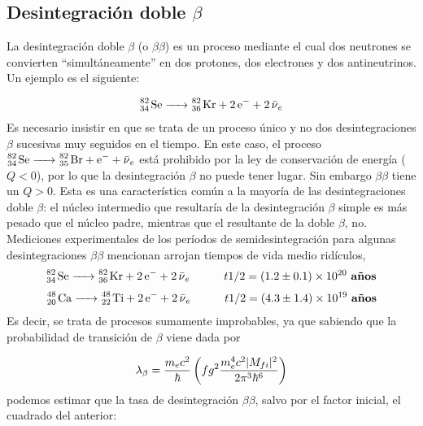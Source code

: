 \subsection{Desintegración doble $\beta$}

La desintegración doble $\beta$ (o $\beta \beta$) es un proceso mediante el cual dos neutrones se convierten ``simultáneamente'' en dos protones, dos electrones y dos antineutrinos. Un ejemplo es el siguiente:

\begin{eqnarray}
	\ce{^82_34 Se -> ^82_36 Kr + 2e^- + 2\bar{\nu}_e}
\end{eqnarray}
Es necesario insistir en que se trata de un proceso único y no dos desintegraciones $\beta$ sucesivas muy seguidos en el tiempo. En este caso, el proceso $
\ce{^82_34 Se -> ^82_35 Br + e^- + \bar{\nu}_e}$ está prohibido por la ley de conservación de energía ($Q<0$), por lo que la desintegración $\beta$ no puede tener lugar. Sin embargo $\beta \beta$ tiene un $Q>0$. Esta es una característica común a la mayoría de las desintegraciones doble $\beta$: el núcleo intermedio que resultaría de la desintegración $\beta$ simple es más pesado que el núcleo padre, mientras que el resultante de la doble $\beta$, no. \\

Mediciones experimentales de los períodos de semidesintegración para  algunas desintegraciones $\beta \beta$ mencionan arrojan tiempos de vida medio ridículos, 
\begin{eqnarray}
	\ce{^82_34 Se -> ^82_36 Kr + 2e^- + 2\bar{\nu}_e} \tquad t{1/2} = (1.2\pm 0.1)\times10^{20} \ \textbf{años}
\end{eqnarray}
\begin{eqnarray}
\ce{^48_20 Ca -> ^48_22 Ti + 2e^- + 2\bar{\nu}_e} \tquad t{1/2} = (4.3\pm 1.4)\times10^{19} \ \textbf{años}
\end{eqnarray}
Es decir, se trata de procesos sumamente improbables, ya que sabiendo que la probabilidad de transición de $\beta$ viene dada por

\begin{eqnarray}
	\lambda_\beta = \frac{m_e c^2}{\hbar} \left( fg^2 \frac{m_e^4 c^2 |M_{fi}|^2}{2\pi^3 \hbar^6} \right)
\end{eqnarray}
podemos estimar que la tasa de desintegración $\beta \beta$, salvo por el factor inicial, el cuadrado del anterior:

